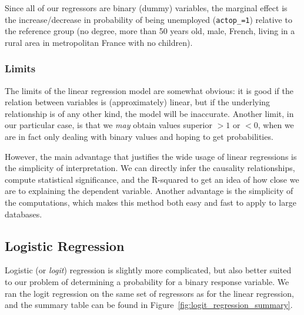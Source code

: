 Since all of our regressors are binary (dummy) variables, the marginal effect is the increase/decrease in probability of being unemployed (\texttt{actop\_=1}) relative to the reference group (no degree, more than 50 years old, male, French, living in a rural area in metropolitan France with no children).

\subsubsection{Limits}
The limits of the linear regression model are somewhat obvious: it is good if the relation between variables is (approximately) linear, but if the underlying relationship is of any other kind, the model will be inaccurate. Another limit, in our particular case, is that we \textit{may} obtain values superior $>1$ or $<0$, when we are in fact only dealing with binary values and hoping to get probabilities.

However, the main advantage that justifies the wide usage of linear regressions is the simplicity of interpretation. We can directly infer the causality relationships, compute statistical significance, and the R-squared to get an idea of how close we are to explaining the dependent variable. Another advantage is the simplicity of the computations, which makes this method both easy and fast to apply to large databases.


\subsection{Logistic Regression}
Logistic (or \textit{logit}) regression is slightly more complicated, but also better suited to our problem of determining a probability for a binary response variable. We ran the logit regression on the same set of regressors as for the linear regression, and the summary table can be found in Figure~\ref{fig:logit_regression_summary}.

